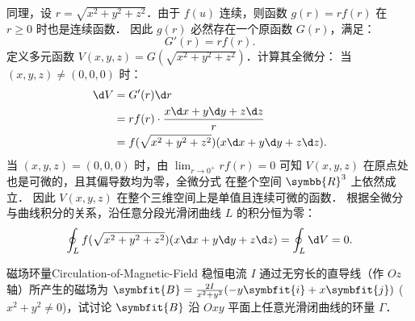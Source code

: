 \begin{myproof}
    同理，设 $r = \sqrt{x^2 + y^2 + z^2}$．由于 $f(u)$ 连续，则函数 $g(r) = r f(r)$ 在 $r \ge 0$ 时也是连续函数．
    因此 $g(r)$ 必然存在一个原函数 $G(r)$，满足：
    \begin{equation}
        \label{eq:primitive-2}
        G'(r) = r f(r).
    \end{equation}
    定义多元函数 $V(x, y, z) = G\left(\sqrt{x^2 + y^2 + z^2}\right)$．计算其全微分：
    当 $(x, y, z) \neq (0,0,0)$ 时：
    \begin{equation}
        \label{eq:differential-2}
        \begin{aligned}
            \d V & = G'(r) \d r                                           \\
                 & = r f(r) \cdot \frac{x \d x + y \d y + z \d z}{r}      \\
                 & = f(\sqrt{x^2 + y^2 + z^2})(x \d x + y \d y + z \d z).
        \end{aligned}
    \end{equation}
    当 $(x, y, z) = (0,0,0)$ 时，由 $\lim_{r \to 0^+} r f(r) = 0$ 可知 $V(x, y, z)$ 在原点处也是可微的，且其偏导数均为零，全微分式  在整个空间 $\symbb{R}^3$ 上依然成立．
    因此 $V(x, y, z)$ 在整个三维空间上是单值且连续可微的函数．
    根据全微分与曲线积分的关系，沿任意分段光滑闭曲线 $L$ 的积分恒为零：
    \begin{equation}
        \oint_L f(\sqrt{x^2 + y^2 + z^2})(x \d x + y \d y + z \d z) = \oint_L \d V = 0.
    \end{equation}
\end{myproof}

\begin{problem}{磁场环量}{Circulation-of-Magnetic-Field}
    稳恒电流 $I$ 通过无穷长的直导线（作 $Oz$ 轴）所产生的磁场为 $\symbfit{B} = \frac{2I}{x^2+y^2}(-y\symbfit{i} + x\symbfit{j})$ ($x^2+y^2 \neq 0$)，试讨论 $\symbfit{B}$ 沿 $Oxy$ 平面上任意光滑闭曲线的环量 $\Gamma$．
\end{problem}

